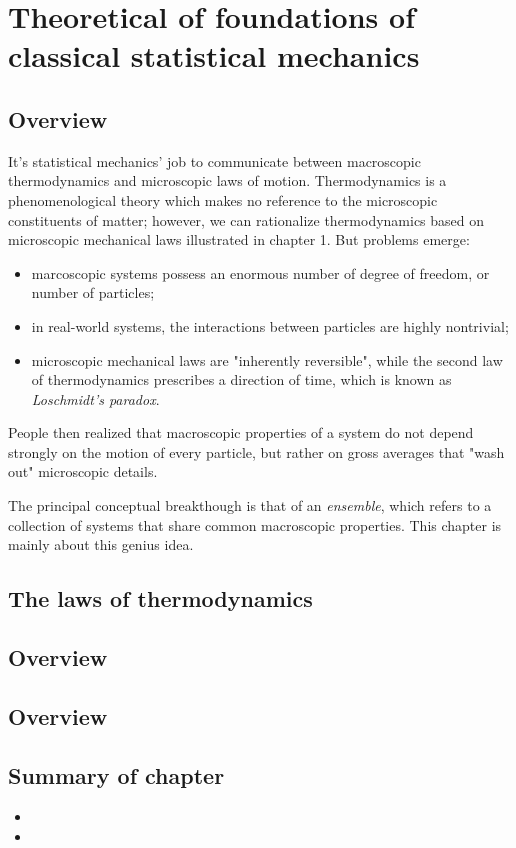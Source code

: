 \chapter{Theoretical of foundations of classical statistical mechanics}

\section{Overview}

It's statistical mechanics' job to communicate between macroscopic thermodynamics and microscopic laws of motion. Thermodynamics is a phenomenological theory which makes no reference to the microscopic constituents of matter; however, we can rationalize thermodynamics based on microscopic mechanical laws illustrated in chapter 1. But problems emerge:
\begin{itemize}
	\item marcoscopic systems possess an enormous number of degree of freedom, or number of particles;
	\item in real-world systems, the interactions between particles are highly nontrivial;
	\item microscopic mechanical laws are "inherently reversible", while the second law of thermodynamics prescribes a direction of time, which is known as \textit{Loschmidt's paradox}.
\end{itemize}
People then realized that macroscopic properties of a system do not depend strongly on the motion of every particle, but rather on gross averages that "wash out" microscopic details. 

The principal conceptual breakthough is that of an \textit{ensemble}, which refers to a collection of systems that share common macroscopic properties. This chapter is mainly about this genius idea.

\section{The laws of thermodynamics}



\section{Overview}

\section{Overview}


\section*{Summary of chapter}

\begin{itemize}
	\item 
	\item 
\end{itemize}
